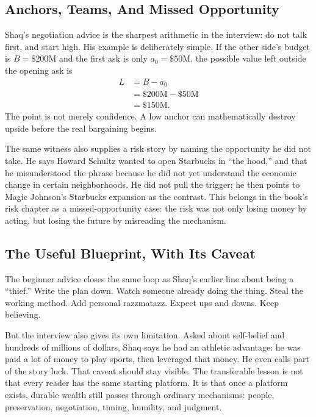 \documentclass[11pt,oneside]{book}
\begin{document}
\subsection{Anchors, Teams, And Missed Opportunity}

Shaq's negotiation advice is the sharpest arithmetic in the interview: do not talk first, and start high. His example is deliberately simple. If the other side's budget is \(B=\$200\mathrm{M}\) and the first ask is only \(a_0=\$50\mathrm{M}\), the possible value left outside the opening ask is
\begin{align}
L&=B-a_0\\
&=\$200\mathrm{M}-\$50\mathrm{M}\\
&=\$150\mathrm{M}.
\end{align}
The point is not merely confidence. A low anchor can mathematically destroy upside before the real bargaining begins.

The same witness also supplies a risk story by naming the opportunity he did not take. He says Howard Schultz wanted to open Starbucks in ``the hood,'' and that he misunderstood the phrase because he did not yet understand the economic change in certain neighborhoods. He did not pull the trigger; he then points to Magic Johnson's Starbucks expansion as the contrast. This belongs in the book's risk chapter as a missed-opportunity case: the risk was not only losing money by acting, but losing the future by misreading the mechanism.

\subsection{The Useful Blueprint, With Its Caveat}

The beginner advice closes the same loop as Shaq's earlier line about being a ``thief.'' Write the plan down. Watch someone already doing the thing. Steal the working method. Add personal razzmatazz. Expect ups and downs. Keep believing.

But the interview also gives its own limitation. Asked about self-belief and hundreds of millions of dollars, Shaq says he had an athletic advantage: he was paid a lot of money to play sports, then leveraged that money. He even calls part of the story luck. That caveat should stay visible. The transferable lesson is not that every reader has the same starting platform. It is that once a platform exists, durable wealth still passes through ordinary mechanisms: people, preservation, negotiation, timing, humility, and judgment.
\end{document}
